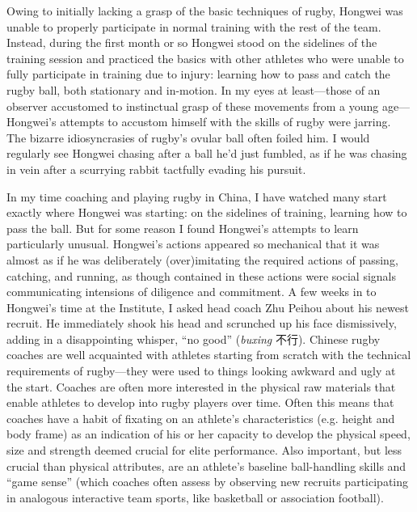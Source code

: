 Owing to initially lacking a grasp of the basic techniques of rugby, Hongwei was unable to properly participate in normal training with the rest of the team. Instead, during the first month or so Hongwei stood on the sidelines of the training session and practiced the basics with other athletes who were unable to fully participate in training due to injury: learning how to pass and catch the rugby ball, both stationary and in-motion. In my eyes at least---those of an observer accustomed to instinctual grasp of these movements from a young age---Hongwei's attempts to accustom himself with the skills of rugby were jarring.  The bizarre idiosyncrasies of rugby's ovular ball often foiled him. I would regularly see Hongwei chasing after a ball he'd just fumbled, as if he was chasing in vein after a scurrying rabbit tactfully evading his pursuit.

In my time coaching and playing rugby in China, I have watched many start exactly where Hongwei was starting: on the sidelines of training, learning how to pass the ball.  But for some reason I found Hongwei’s attempts to learn particularly unusual.  Hongwei's actions appeared so mechanical that it was almost as if he was deliberately (over)imitating the required actions of passing, catching, and running, as though contained in these actions were social signals communicating intensions of diligence and commitment.
A few weeks in to Hongwei’s time at the Institute, I asked head coach Zhu Peihou about his newest recruit.  He immediately shook his head and scrunched up his face dismissively, adding in a disappointing whisper, ``no good'' (\textit{buxing} 不行).  Chinese rugby coaches are well acquainted with athletes starting from scratch with the technical requirements of rugby---they were used to things looking awkward and ugly at the start. Coaches are often more interested in the physical raw materials that enable athletes to develop into rugby players over time.  Often this means that coaches have a habit of fixating on an athlete's characteristics (e.g. height and body frame) as an indication of his or her capacity to develop the physical speed, size and strength deemed crucial for elite performance.  Also important, but less crucial than physical attributes, are an athlete’s baseline ball-handling skills and ``game sense'' (which coaches often assess by observing new recruits participating in analogous interactive team sports, like basketball or association football).

